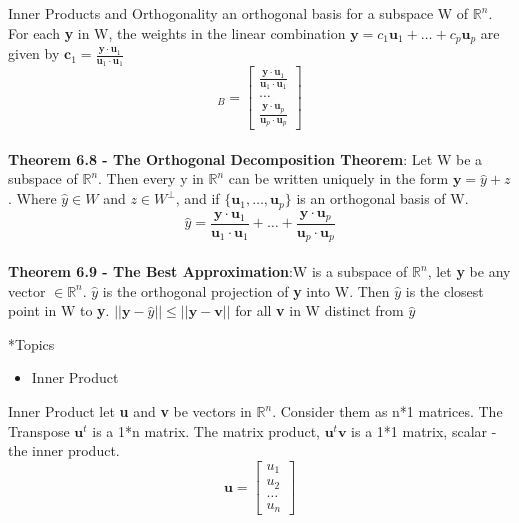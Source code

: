 \documentclass[a4paper, 12pt]{article}
\begin{document}
\begin{section}{Inner Products and Orthogonality}
an orthogonal basis for a subspace W of $\mathbb{R}^{n}$. For each \textbf{y} in 
W, the weights in the linear combination $\textbf{y}=c_1\textbf{u}_{1}+\ldots+
c_{p}\textbf{u}_{p}$ are given by $\textbf{c}_{1}=\frac{\textbf{y}\cdot
\textbf{u}_{1}}{\textbf{u}_{1}\cdot\textbf{u}_{1}}$
\begin{equation}
	[\textbf{y}]_{B}=\begin{bmatrix} \frac{\textbf{y}\cdot
\textbf{u}_{1}}{\textbf{u}_{1}\cdot\textbf{u}_{1}} \\ \dots \\
\frac{\textbf{y}\cdot \textbf{u}_{p}}{\textbf{u}_{p}\cdot\textbf{u}_{p}} 
\end{bmatrix} 
\end{equation}
\\ \noindent \textbf{Theorem 6.8 - The Orthogonal Decomposition Theorem}:
Let W be a subspace of $\mathbb{R}^{n}$. Then every y in $\mathbb{R}^{n}$ can be
written uniquely in the form $\textbf{y}=\hat{y} + z$. Where $\hat{y} \in W$ and 
$z \in W^{\perp}$, and if $\{\textbf{u}_{1},\ldots,\textbf{u}_{p}\}$ is an 
orthogonal basis of W. 
\begin{equation}
\hat{y}=\frac{\textbf{y}\cdot\textbf{u}_{1}}{\textbf{u}_{1}\cdot\textbf{u}_{1}}+
\dots +
\frac{\textbf{y}\cdot\textbf{u}_{p}}{\textbf{u}_{p}\cdot\textbf{u}_{p}}
\end{equation}
\\ \noindent \textbf{Theorem 6.9 - The Best Approximation}:W is a subspace of
$\mathbb{R}^{n}$, let \textbf{y} be any vector $\in \mathbb{R}^{n}$. $\hat{y}$ is
the orthogonal projection of \textbf{y} into W. Then $\hat{y}$ is the closest
point in  W to \textbf{y}. $||\textbf{y}-\hat{y}||\leq||\textbf{y}-\textbf{v}||$
for all \textbf{v} in W distinct from $\hat{y}$
\begin{subsection}*{Topics}
\begin{itemize}
\item{Inner Product}
\end{itemize}
\end{subsection}
\begin{subsection}{Inner Product}
let \textbf{u} and \textbf{v} be vectors in $\mathbb{R}^{n}$. Consider them as
n*1 matrices. The Transpose $\textbf{u}^{t}$ is a 1*n matrix. The matrix product,
$\textbf{u}^{t}\textbf{v}$ is a 1*1 matrix, scalar - the inner product. \\
\begin{equation}
\textbf{u}=\begin{bmatrix} u_1 \\ u_2 \\ \dots \\ u_{n} \end{bmatrix} 

\end{equation}
\end{subsection}
\end{section}
\end{document}
